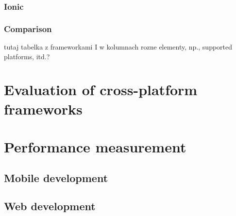 \subsubsection{Ionic}
\subsubsection{Comparison}
tutaj tabelka z frameworkami I w kolumnach rozne elementy, np., supported platforms, itd.?

\section{Evaluation of cross-platform frameworks}

\section{Performance measurement}

\subsection{Mobile development}

\subsection{Web development}









